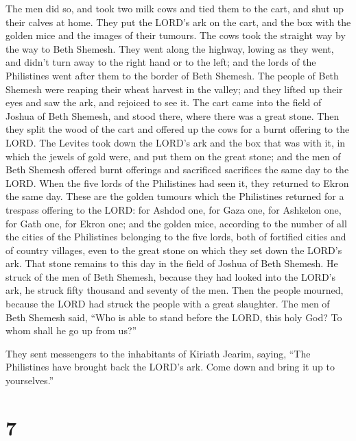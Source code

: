  The men did so, and took two milk cows and tied them to
the cart, and shut up their calves at home.  They put the
LORD's ark on the cart, and the box with the golden mice and the images
of their tumours.  The cows took the straight way by the
way to Beth Shemesh. They went along the highway, lowing as they went,
and didn't turn away to the right hand or to the left; and the lords of
the Philistines went after them to the border of Beth Shemesh.
 The people of Beth Shemesh were reaping their wheat
harvest in the valley; and they lifted up their eyes and saw the ark,
and rejoiced to see it.  The cart came into the field of
Joshua of Beth Shemesh, and stood there, where there was a great stone.
Then they split the wood of the cart and offered up the cows for a burnt
offering to the LORD.  The Levites took down the LORD's
ark and the box that was with it, in which the jewels of gold were, and
put them on the great stone; and the men of Beth Shemesh offered burnt
offerings and sacrificed sacrifices the same day to the LORD.
 When the five lords of the Philistines had seen it, they
returned to Ekron the same day.  These are the golden
tumours which the Philistines returned for a trespass offering to the
LORD: for Ashdod one, for Gaza one, for Ashkelon one, for Gath one, for
Ekron one;  and the golden mice, according to the number
of all the cities of the Philistines belonging to the five lords, both
of fortified cities and of country villages, even to the great stone on
which they set down the LORD's ark. That stone remains to this day in
the field of Joshua of Beth Shemesh.  He struck of the
men of Beth Shemesh, because they had looked into the LORD's ark, he
struck fifty thousand and seventy of the men. Then the people mourned,
because the LORD had struck the people with a great slaughter.
 The men of Beth Shemesh said, ``Who is able to stand
before the LORD, this holy God? To whom shall he go up from us?''

 They sent messengers to the inhabitants of Kiriath
Jearim, saying, ``The Philistines have brought back the LORD's ark. Come
down and bring it up to yourselves.''

\hypertarget{section-6}{%
\section{7}\label{section-6}}

